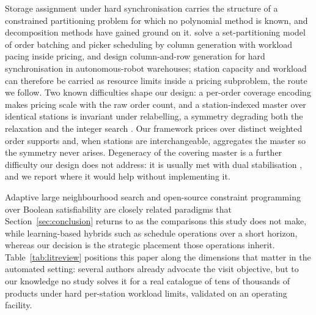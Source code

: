 \documentclass[]{interact}
\begin{document}
Storage assignment under hard synchronisation carries the structure of a constrained partitioning problem for which no polynomial method is known, and decomposition methods have gained ground on it. \citet{muter2022} solve a set-partitioning model of order batching and picker scheduling by column generation with workload pacing inside pricing, and \citet{zhen2025} design column-and-row generation for hard synchronisation in autonomous-robot warehouses; station capacity and workload can therefore be carried as resource limits inside a pricing subproblem, the route we follow. Two known difficulties shape our design: a per-order coverage encoding makes pricing scale with the raw order count, and a station-indexed master over identical stations is invariant under relabelling, a symmetry degrading both the relaxation and the integer search \citep{vanderbeck2000dw}. Our framework prices over distinct weighted order supports and, when stations are interchangeable, aggregates the master so the symmetry never arises. Degeneracy of the covering master is a further difficulty our design does not address: it is usually met with dual stabilisation \citep{dumerle1999stabilized, wentges1997weighted}, and we report where it would help without implementing it.

Adaptive large neighbourhood search \citep{ropke2006alns} and open-source constraint programming over Boolean satisfiability \citep{perron2023cpsat} are closely related paradigms that Section~\ref{sec:conclusion} returns to as the comparisons this study does not make, while learning-based hybrids such as \citet{barnhart2024learnthenoptimize} schedule operations over a short horizon, whereas our decision is the strategic placement those operations inherit. Table~\ref{tab:litreview} positions this paper along the dimensions that matter in the automated setting: several authors already advocate the visit objective, but to our knowledge no study solves it for a real catalogue of tens of thousands of products under hard per-station workload limits, validated on an operating facility.
\end{document}
